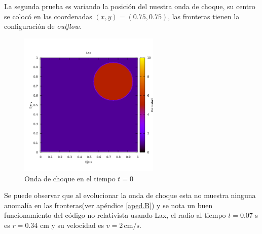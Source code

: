 \documentclass[12pt,a4paper]{book}
\begin{document}
La segunda prueba es variando la posición del nuestra onda de choque, su centro se colocó en las coordenadas $(x, y) = (0.75, 0.75)$, las fronteras tienen la configuración de \textit{outflow}.

\begin{figure}[H]
\centering
\includegraphics[width=0.6\textwidth]{./Figuras/Pruebas/Prueba_onda_choque/onda_choque2_t_0}
\caption{Onda de choque en el tiempo $t = 0$} \label{fig:onda_choque2_t_0}
\end{figure}

 Se puede observar que al evolucionar la onda de choque esta no muestra ninguna anomalía en las fronteras(ver apéndice \ref{aped.B}) y se nota un buen funcionamiento del código no relativista usando Lax, el radio al tiempo $t = 0.07$ s es $r = 0.34$ cm y su velocidad es $v = 2 \, \mathrm{cm}/\mathrm{s}$.
\end{document}
